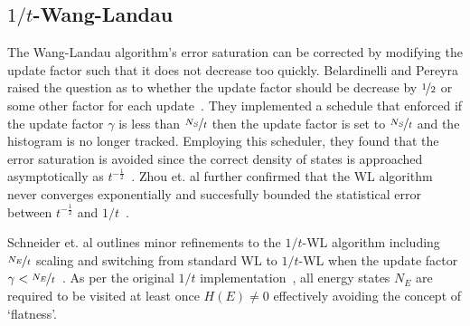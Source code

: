 \documentclass[letterpaper,twocolumn,amsmath,amssymb,pre,aps,10pt]{revtex4-1}
\begin{document}
\subsection{$1/t$-Wang-Landau}
The Wang-Landau algorithm's error saturation can be corrected by
modifying the update factor such that it does not decrease too quickly.
Belardinelli and Pereyra raised the question as to whether the update
factor should be decrease by $\nicefrac12$ or some other factor for
each update~\cite{belardinelli2007fast}. They implemented a schedule
that enforced if the update factor $\gamma$ is less than
$\nicefrac{N_S}{t}$ then the update factor is set to
$\nicefrac{N_S}{t}$ and the histogram is no longer tracked. Employing
this scheduler, they found that the error saturation is avoided since
the correct density of states is approached asymptotically as
$t^{-\frac12}$~\cite{belardinelli2008analysis}. Zhou et. al further
confirmed that the WL algorithm never converges exponentially and
succesfully bounded the statistical error between
$t^{-\frac12}$ and $1/t$~\cite{zhou2008optimal}.

Schneider et. al outlines minor refinements to the $1/t$-WL algorithm
including $\nicefrac{N_E}{t}$ scaling and switching from standard WL to
$1/t$-WL when the update factor $\gamma <
\nicefrac{N_E}{t}$~\cite{schneider2017convergence}. As per the original
$1/t$ implementation~\cite{belardinelli2007fast}, all energy states $N_E$
are required to be visited at least once $H(E) \neq 0$ effectively
avoiding the concept of `flatness'.
\end{document}
